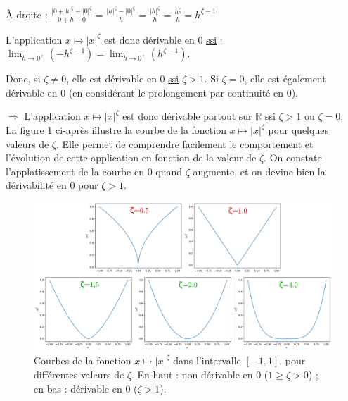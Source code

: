 \vspace{1.0mm}
\noindent À droite : $\frac{|0+h|^\zeta - |0|^\zeta}{0+h-0} = \frac{|h|^\zeta - |0|^\zeta}{h} = \frac{|h|^\zeta}{h} = \frac{h^\zeta}{h} = h^{\zeta-1}$

\vspace{1.0mm}
\noindent L'application $x \mapsto |x|^\zeta$ est donc dérivable en $0$ \underline{ssi} : $\lim_{h \rightarrow 0^+} \left ( -h^{\zeta-1} \right ) = \lim_{h \rightarrow 0^+} \left ( h^{\zeta-1} \right )$.

\noindent Donc, si $\zeta \neq 0$, elle est dérivable en $0$ \underline{ssi} $\zeta>1$. Si $\zeta=0$, elle est également dérivable en $0$ (en considérant le prolongement par continuité en $0$).

\vspace{5.0mm}
\noindent $\Rightarrow$ L'application $x \mapsto |x|^\zeta$ est donc dérivable partout sur $\mathbb{R}$ \underline{ssi} $\zeta > 1$ ou $\zeta=0$. \\


\vspace{1.6mm}
La figure \ref{fig:powered_absolute_curves} ci-après illustre la courbe de la fonction $x \mapsto |x|^\zeta$ pour quelques valeurs de $\zeta$. Elle permet de comprendre facilement le comportement et l'évolution de cette application en fonction de la valeur de $\zeta$. On constate l'applatissement de la courbe en $0$ quand $\zeta$ augmente, et on devine bien la dérivabilité en $0$ pour $\zeta > 1$.



\newpage

\begin{figure}[htp]
  \begin{center}
    \includegraphics[width=0.80\linewidth]{parts/3-contributions/C-contraintes_geometriques/figures/curves.pdf}
    \caption{ \centering Courbes de la fonction $x \mapsto |x|^\zeta$ dans l'intervalle $[-1,1]$, pour différentes valeurs de $\zeta$. En-haut : non dérivable en $0$ ($1 \geqslant \zeta > 0$) ; en-bas : dérivable en $0$ ($\zeta > 1$).}
    \label{fig:powered_absolute_curves}
  \end{center}
\end{figure}


